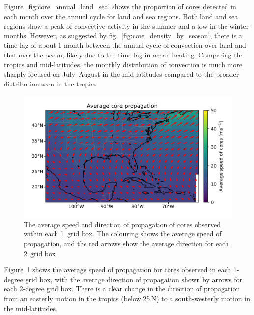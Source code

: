 Figure~\ref{fig:core_annual_land_sea} shows the proportion of cores detected in each month over the annual cycle for land and sea regions.
Both land and sea regions show a peak of convective activity in the summer and a low in the winter months.
However, as suggested by fig.~\ref{fig:core_density_by_season}, there is a time lag of about 1 month between the annual cycle of convection over land and that over the ocean, likely due to the time lag in ocean heating.
Comparing the tropics and mid-latitudes, the monthly distribution of convection is much more sharply focused on July--August in the mid-latitudes compared to the broader distribution seen in the tropics.


\begin{figure}[tp]
    \centering
    \includegraphics[width=\textwidth]{figures/chapter2_05.png}
    \caption[
    The average speed and direction of propagation of cores
    ]{
    The average speed and direction of propagation of cores observed within each 1\textdegree\ grid box. The colouring shows the average speed of propagation, and the red arrows show the average direction for each 2\textdegree\ grid box}
    \label{fig:core_propagation_map}
\end{figure}

Figure~\ref{fig:core_propagation_map} shows the average speed of propagation for cores observed in each 1-degree grid box, with the average direction of propagation shown by arrows for each 2-degree grid box.
There is a clear change in the direction of propagation from an easterly motion in the tropics (below 25\,\textdegree N) to a south-westerly motion in the mid-latitudes.

